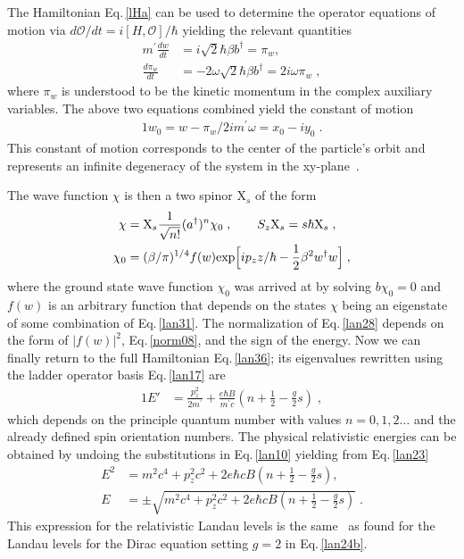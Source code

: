 \documentclass[epj]{svjour}
\begin{document}
The Hamiltonian Eq.\,\eqref{lHa} can be used to determine the operator equations of motion via $d\mathcal{O}/dt=i[H,\mathcal{O}]/\hbar$ yielding the relevant quantities
\begin{subequations}
\begin{alignat}{1}
\label{lan29} m^\prime \frac{dw}{dt}&=i\sqrt{2}\hbar\beta b^{\dagger}=\pi_{w},\\ \frac{d\pi_{w}}{dt}&=-2\omega\sqrt{2}\hbar\beta b^{\dagger}=2i\omega\pi_{w}\;,
\end{alignat}
\end{subequations}
where $\pi_{w}$ is understood to be the kinetic momentum in the complex auxiliary variables. The above two equations combined yield the constant of motion 
\begin{alignat}{1}
\label{lan31} w_{0}=w-\pi_{w}/2im^\prime \omega =x_{0}-iy_{0}\;.
\end{alignat}
This constant of motion corresponds to the center of the particle\rq s orbit and represents an infinite degeneracy of the system in the xy-plane~\cite{Johnson:1950zz}.

The wave function $\chi$ is then a two spinor $\mathrm{X}_{s}$ of the form
\begin{alignat}{1}
\label{lan28} \chi&=\mathrm{X}_{s}\frac{1}{\sqrt{n!}}(a^{\dagger})^{n}\chi_{0}\;,
\qquad 
S_{z}\mathrm{X}_{s}=s\hbar\mathrm{X}_{s}\;,\\ \notag \chi_{0}&=(\beta/\pi)^{1/4}f(w)\mathrm{exp}\Big[ip_{z}z/\hbar-\frac{1}{2}\beta^{2}w^{\dagger}w\Big]\;,\end{alignat}
where the ground state wave function $\chi_{0}$ was arrived at by solving $b\chi_{0}=0$ and $f(w)$ is an arbitrary function that depends on the states $\chi$ being an eigenstate of some combination of Eq.\,\eqref{lan31}. The normalization of Eq.\,\eqref{lan28} depends on the form of $|f(w)|^{2}$, Eq.\,\eqref{norm08}, and the sign of the energy. Now we can finally return to the full Hamiltonian Eq.\,\eqref{lan36}; its eigenvalues rewritten using the ladder operator basis Eq.\,\eqref{lan17} are
\begin{alignat}{1}
\label{lan23} E'&=\frac{p_{z}^{2}}{2m^\prime }+\frac{e\hbar B}{m^\prime c}\left(n+\frac{1}{2}-\frac{g}{2}s\right)\;,\end{alignat}
which depends on the principle quantum number with values $n=0,1,2\ldots$ and the already defined spin orientation numbers. The physical relativistic energies can be obtained by undoing the substitutions in Eq.\,\eqref{lan10} yielding from Eq.\,\eqref{lan23}
\begin{subequations}
\begin{alignat}{1}
\label{lan24} E^{2}&=m^{2}c^{4}+p_{z}^{2}c^{2}+2e\hbar cB\left(n+\frac{1}{2}-\frac{g}{2}s\right),\\[0.2cm] \label{lan24b} 
 E&=\pm\sqrt{m^{2}c^{4}+p_{z}^{2}c^{2}+2e\hbar cB\left(n+\frac{1}{2}-\frac{g}{2}s\right)}\;.
\end{alignat}
\end{subequations}
This expression for the relativistic Landau levels is the same~\cite{Johnson:1950zz,Ferrer:2009nq} as found for the Landau levels for the Dirac equation setting $g=2$ in Eq.\,\eqref{lan24b}. 
\end{document}
